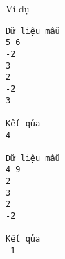 Ví dụ  
\begin{verbatim}
Dữ liệu mẫu
5 6
-2
3
2
-2
3

Kết qủa
4

Dữ liệu mẫu
4 9
2
3
2
-2

Kết qủa
-1
\end{verbatim}